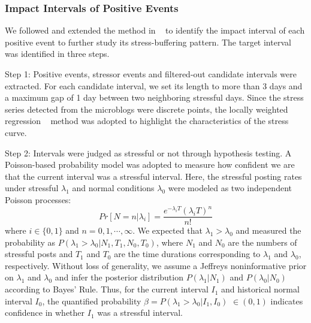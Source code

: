 \documentclass[5p,times,numbers,authoryear]{elsarticle}
\begin{document}
\subsubsection{Impact Intervals of Positive Events}
\label{subsec:interval}
We followed and extended the method in ~\citep{Li2017Analyzing} to identify the impact interval of each positive event to further study its stress-buffering pattern.
The target interval was identified in three steps.

Step 1:
Positive events, stressor events and filtered-out candidate intervals were extracted.
For each candidate interval, we set its length to more than 3 days and a maximum gap of 1 day between two neighboring stressful days.
Since the stress series detected from the microblogs were discrete points, the locally weighted regression ~\citep{Cleveland1988Locally} method was adopted to highlight the characteristics of the stress curve.

Step 2: 
Intervals were judged as stressful or not through hypothesis testing.
A Poisson-based probability model was adopted to measure how confident we are that the current interval was a stressful interval.
Here, the stressful posting rates under stressful $\lambda_1$ and normal conditions $\lambda_0$ were modeled as two independent Poisson processes:
\begin{equation}
Pr[N=n|\lambda_i]=\frac{e^{-\lambda_i T}{(\lambda_i T)}^n}{n!}
\end{equation}
where $i\in\{0,1\}$ and $n=0,1,\cdots,\infty$.
We expected that $\lambda_1 > \lambda_0$ and measured the probability as $P(\lambda_1>\lambda_0|N_1, T_1, N_0, T_0)$,
where $N_1$ and $N_0$ are the numbers of stressful posts and $T_1$ and $T_0$ are the time durations corresponding to $\lambda_1$ and $\lambda_0$, respectively.
Without loss of generality, we assume a Jeffreys noninformative prior on $\lambda_1$ and $\lambda_0$ and infer the posterior distribution $P(\lambda_1|N_1)$ and $P(\lambda_0|N_0)$ according to Bayes' Rule.
Thus, for the current interval $I_1$ and historical normal interval $I_0$, the quantified probability $\beta = P(\lambda_1>\lambda_0|I_1,I_0)$ $\in (0,1)$ indicates confidence in 
whether $I_1$ was a stressful interval.
\end{document}
